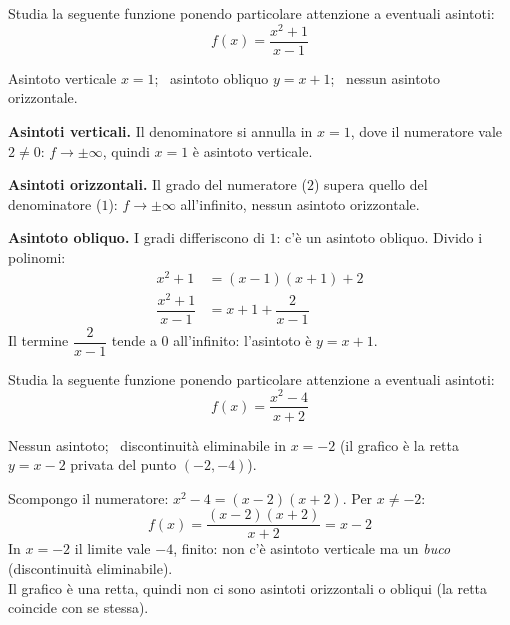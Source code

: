 \begin{question}[ID=5.1, subtitle={Asintoti di $f(x)=(x^2+1)/(x-1)$}, tags={continuità, asintoti}, difficulty=media]
Studia la seguente funzione ponendo particolare attenzione a eventuali asintoti:
\begin{equation*}
    f(x) =\frac{x^2+1}{x-1}
\end{equation*}
\begin{solution}
Asintoto verticale $x=1$; \ asintoto obliquo $y=x+1$; \ nessun asintoto orizzontale.
\end{solution}
\begin{explanation}
\textbf{Asintoti verticali.} Il denominatore si annulla in $x=1$, dove il numeratore vale $2\neq0$: $f\to\pm\infty$, quindi $x=1$ è asintoto verticale.

\textbf{Asintoti orizzontali.} Il grado del numeratore ($2$) supera quello del denominatore ($1$): $f\to\pm\infty$ all'infinito, nessun asintoto orizzontale.

\textbf{Asintoto obliquo.} I gradi differiscono di $1$: c'è un asintoto obliquo. Divido i polinomi:
\[\begin{aligned}
x^2+1 &= (x-1)(x+1)+2\\
\dfrac{x^2+1}{x-1} &= x+1+\dfrac{2}{x-1}
\end{aligned}\]
Il termine $\dfrac{2}{x-1}$ tende a $0$ all'infinito: l'asintoto è $y=x+1$.
\end{explanation}
\end{question}


\begin{question}[ID=5.2, subtitle={Asintoti di $f(x)=(x^2-4)/(x+2)$}, tags={continuità, asintoti}, difficulty=facile]
Studia la seguente funzione ponendo particolare attenzione a eventuali asintoti:
\begin{equation*}
    f(x) = \frac{x^2 - 4}{x+2}
\end{equation*}
\begin{solution}
Nessun asintoto; \ discontinuità eliminabile in $x=-2$ (il grafico è la retta $y=x-2$ privata del punto $(-2,-4)$).
\end{solution}
\begin{explanation}
Scompongo il numeratore: $x^2-4=(x-2)(x+2)$. Per $x\neq-2$:
\[ f(x)=\dfrac{(x-2)(x+2)}{x+2}=x-2 \]
In $x=-2$ il limite vale $-4$, finito: non c'è asintoto verticale ma un \emph{buco} (discontinuità eliminabile). \\
Il grafico è una retta, quindi non ci sono asintoti orizzontali o obliqui (la retta coincide con se stessa).
\end{explanation}
\end{question}

